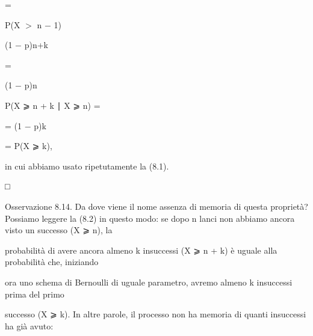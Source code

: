 \documentclass[a4paper,portrait,12pt]{article}
\begin{document}
=


\begin{flushleft}
P(X $>$ n $-$ 1)
\end{flushleft}


\begin{flushleft}
(1 $-$ p)n+k
\end{flushleft}


=


\begin{flushleft}
(1 $-$ p)n
\end{flushleft}





\begin{flushleft}
P(X ⩾ n + k ∣ X ⩾ n) =
\end{flushleft}





\begin{flushleft}
= (1 $-$ p)k
\end{flushleft}


\begin{flushleft}
= P(X ⩾ k),
\end{flushleft}


\begin{flushleft}
in cui abbiamo usato ripetutamente la (8.1).
\end{flushleft}





□





\begin{flushleft}
Osservazione 8.14. Da dove viene il nome assenza di memoria di questa propriet\`{a}? Possiamo leggere la (8.2) in questo modo: se dopo n lanci non abbiamo ancora visto un successo (X ⩾ n), la
\end{flushleft}


\begin{flushleft}
probabilit\`{a} di avere ancora almeno k insuccessi (X ⩾ n + k) \`{e} uguale alla probabilit\`{a} che, iniziando
\end{flushleft}


\begin{flushleft}
ora uno schema di Bernoulli di uguale parametro, avremo almeno k insuccessi prima del primo
\end{flushleft}


\begin{flushleft}
successo (X ⩾ k). In altre parole, il processo non ha memoria di quanti insuccessi ha gi\`{a} avuto:
\end{flushleft}
\end{document}
